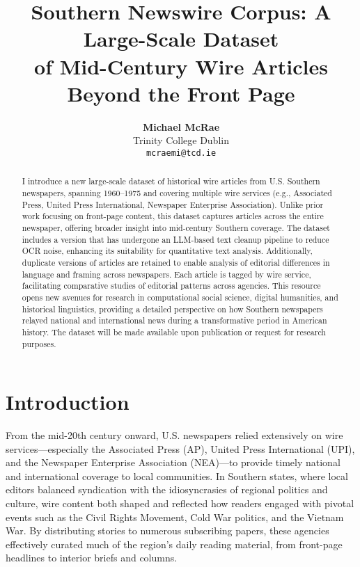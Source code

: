 \documentclass{article}
\title{\textbf{Southern Newswire Corpus: A Large-Scale Dataset\\ of Mid-Century Wire Articles Beyond the Front Page}}
\author{\textbf{Michael McRae} \\
Trinity College Dublin\\
\texttt{mcraemi@tcd.ie}
}
\date{}
\begin{document}
\maketitle

\begin{abstract}
I introduce a new large-scale dataset of historical wire articles from U.S. Southern newspapers, spanning 1960–1975 and covering multiple wire services (e.g., Associated Press, United Press International, Newspaper Enterprise Association). Unlike prior work focusing on front-page content, this dataset captures articles across the entire newspaper, offering broader insight into mid-century Southern coverage. The dataset includes a version that has undergone an LLM-based text cleanup pipeline to reduce OCR noise, enhancing its suitability for quantitative text analysis. Additionally, duplicate versions of articles are retained to enable analysis of editorial differences in language and framing across newspapers. Each article is tagged by wire service, facilitating comparative studies of editorial patterns across agencies. This resource opens new avenues for research in computational social science, digital humanities, and historical linguistics, providing a detailed perspective on how Southern newspapers relayed national and international news during a transformative period in American history. The dataset will be made available upon publication or request for research purposes.
\end{abstract}

\vspace{1em}

\section{Introduction}
From the mid-20th century onward, U.S. newspapers relied extensively on wire services---especially the Associated Press (AP), United Press International (UPI), and the Newspaper Enterprise Association (NEA)---to provide timely national and international coverage to local communities. In Southern states, where local editors balanced syndication with the idiosyncrasies of regional politics and culture, wire content both shaped and reflected how readers engaged with pivotal events such as the Civil Rights Movement, Cold War politics, and the Vietnam War. By distributing stories to numerous subscribing papers, these agencies effectively curated much of the region's daily reading material, from front-page headlines to interior briefs and columns. 
\end{document}
